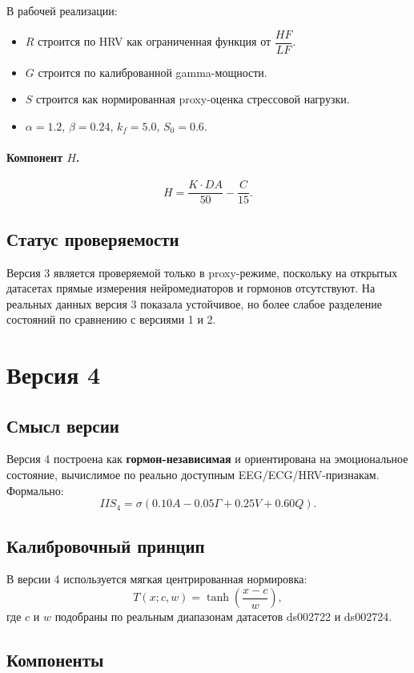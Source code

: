 \documentclass[12pt,a4paper]{article}
\begin{document}
В рабочей реализации:
\begin{itemize}[leftmargin=1.25cm]
    \item $R$ строится по HRV как ограниченная функция от $\dfrac{HF}{LF}$.
    \item $G$ строится по калиброванной gamma-мощности.
    \item $S$ строится как нормированная proxy-оценка стрессовой нагрузки.
    \item $\alpha = 1.2$, $\beta = 0.24$, $k_f=5.0$, $S_0=0.6$.
\end{itemize}

\paragraph{Компонент $H$.}
\[
H = \frac{K \cdot DA}{50} - \frac{C}{15}.
\]

\subsection{Статус проверяемости}
Версия 3 является проверяемой только в proxy-режиме, поскольку на открытых датасетах прямые измерения нейромедиаторов и гормонов отсутствуют. На реальных данных версия 3 показала устойчивое, но более слабое разделение состояний по сравнению с версиями 1 и 2.

\section{Версия 4}
\subsection{Смысл версии}
Версия 4 построена как \textbf{гормон-независимая} и ориентирована на эмоциональное состояние, вычислимое по реально доступным EEG/ECG/HRV-признакам. Формально:
\[
IIS_4 = \sigma\!\left(0.10A - 0.05\Gamma + 0.25V + 0.60Q\right).
\]

\subsection{Калибровочный принцип}
В версии 4 используется мягкая центрированная нормировка:
\[
T(x;c,w)=\tanh\!\left(\frac{x-c}{w}\right),
\]
где $c$ и $w$ подобраны по реальным диапазонам датасетов ds002722 и ds002724.

\subsection{Компоненты}
\end{document}
